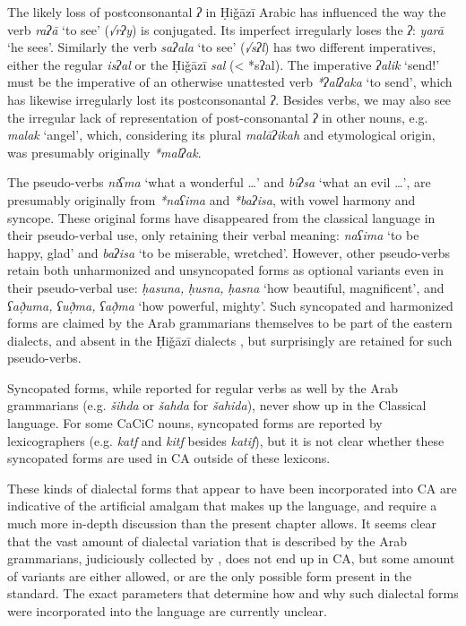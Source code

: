 \documentclass[output=paper]{langsci/langscibook}
\begin{document}
The likely loss of postconsonantal \textit{ʔ} in Ḥiǧāzī Arabic has influenced the way the verb \textit{raʔā} ‘to see’ (\textit{√rʔy}) is conjugated. Its imperfect irregularly loses the \textit{ʔ}: \textit{yarā} ‘he sees’. Similarly the verb \textit{saʔala} ‘to see’ (\textit{√sʔl}) has two different imperatives, either the regular \textit{isʔal} or the Ḥiǧāzī \textit{sal} (< *sʔal). The imperative \textit{ʔalik} ‘send!’ must be the imperative of an otherwise unattested verb \textit{*ʔalʔaka} ‘to send’, which has likewise irregularly lost its postconsonantal \textit{ʔ}. Besides verbs, we may also see the irregular lack of representation of post-consonantal \textit{ʔ} in other nouns, e.g. \textit{malak} ‘angel’, which, considering its plural \textit{malāʔikah} and etymological origin, was presumably originally \textit{*malʔak}.

The pseudo-verbs \textit{niʕma} ‘what a wonderful …’ and \textit{biʔsa} ‘what an evil …’, are presumably originally from \textit{*naʕima} and \textit{*baʔisa}, with vowel harmony and syncope. These original forms have disappeared from the classical language in their pseudo-verbal use, only retaining their verbal meaning: \textit{naʕima} ‘to be happy, glad’ and \textit{baʔisa} ‘to be miserable, wretched’. However, other pseudo-verbs retain both unharmonized and unsyncopated forms as optional variants even in their pseudo-verbal use: \textit{ḥasuna,} \textit{ḥusna,} \textit{ḥasna} ‘how beautiful, magnificent’, and \textit{ʕað̣uma,} \textit{ʕuð̣ma,} \textit{ʕað̣ma} ‘how powerful, mighty’. Such syncopated and harmonized forms are claimed by the Arab grammarians themselves to be part of the eastern dialects, and absent in the Ḥiǧāzī dialects \citep[97]{Rabin1951}, but surprisingly are retained for such pseudo-verbs.

Syncopated forms, while reported for regular verbs as well by the Arab grammarians (e.g. \textit{šihda} or \textit{šahda} for \textit{šahida}), never show up in the Classical language. For some CaCiC nouns, syncopated forms are reported by lexicographers (e.g. \textit{katf} and \textit{kitf} besides \textit{katif}), but it is not clear whether these syncopated forms are used in CA outside of these lexicons.

These kinds of dialectal forms that appear to have been incorporated into CA are indicative of the artificial amalgam that makes up the language, and require a much more in-depth discussion than the present chapter allows. It seems clear that the vast amount of dialectal variation that is described by the Arab grammarians, judiciously collected by \citet{Rabin1951}, does not end up in CA, but some amount of variants are either allowed, or are the only possible form present in the standard. The exact parameters that determine how and why such dialectal forms were incorporated into the language are currently unclear.
\end{document}
